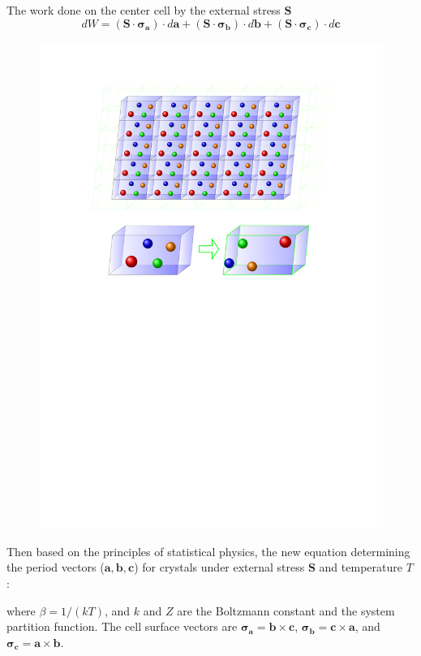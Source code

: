 \documentclass[8pt]{beamer}
\newcommand{\Tup}[0]{\mathbf S}
\newcommand{\bh}[0]{\mathbf h}
\newcommand{\ba}{\mathbf a}
\newcommand{\bb}{\mathbf b}
\newcommand{\bc}{\mathbf c}
\newcommand{\sbbbb}[0]{\bsigma_{\mathbf b}}
\newcommand{\scccc}[0]{\bsigma_{\mathbf c}}
\newcommand{\bsigma}{\mathbf \sigma}
\newcommand{\sh}[0]{\bsigma_{\mathbf h}}
\newcommand{\sa}[0]{\bsigma_{\mathbf a}}
\begin{document}
\begin{frame}{The work done on the center cell by the external stress $\Tup$}
\vspace{-.5cm}
\begin{equation}
      dW =(\Tup \cdot \sa) \cdot d\ba + (\Tup \cdot \sbbbb) \cdot d\bb + (\Tup \cdot \scccc) \cdot d\bc  \label{sss080}
\end{equation}
\vspace{-1.5cm}
      \begin{figure} 
          \includegraphics[width=.8\textwidth]{./translated_cells_by_tikz.pdf}
      \end{figure}
\end{frame}


\begin{frame}{Then based on the principles of statistical physics, the new equation determining the period vectors ($\ba, \bb, \bc$) for crystals under external stress $\Tup$ and temperature $T$: }

\vspace{-1.7cm}{\LARGE  \color{white}{
\begin{equation}
       \Tup \cdot \sh=-\frac {1}{\beta} \frac {\partial \ln Z}{\partial \bh} \ \ \ (\bh=\ba, \bb, \bc) ,
       \label{sss100}
\end{equation}
}}

where $\beta=1/(kT)$, and $k$ and $Z$ are the Boltzmann constant and the system partition function. The cell surface vectors are $\sa=\bb \times \bc$, $\sbbbb=\bc \times \ba$, and $\scccc=\ba \times \bb$.
\end{frame}
\end{document}

